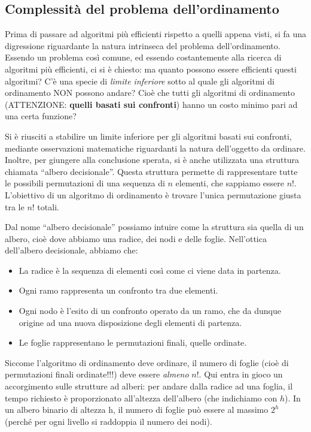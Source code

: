 \documentclass[12pt]{report}
\begin{document}
    \subsection{Complessità del problema dell'ordinamento}
    Prima di passare ad algoritmi più efficienti rispetto a quelli appena visti, si fa una digressione riguardante la natura intrinseca del problema dell’ordinamento.
    Essendo un problema così comune, ed essendo costantemente alla ricerca di algoritmi più efficienti, ci si è chiesto: ma quanto possono essere efficienti questi algoritmi? C’è una specie di \textit{limite inferiore} sotto al quale gli algoritmi di ordinamento NON possono andare? Cioè che tutti gli algoritmi di ordinamento (ATTENZIONE: \textbf{quelli basati sui confronti}) hanno un costo minimo pari ad una certa funzione?
    
    Si è riusciti a stabilire un limite inferiore per gli algoritmi basati sui confronti, mediante osservazioni matematiche riguardanti la natura dell’oggetto da ordinare. Inoltre, per giungere alla conclusione sperata, si è anche utilizzata una struttura chiamata “albero decisionale”.
    Questa struttura permette di rappresentare tutte le possibili permutazioni di una sequenza di $n$ elementi, che sappiamo essere $n!$. L’obiettivo di un algoritmo di ordinamento è trovare l’unica permutazione giusta tra le $n!$ totali.
    
    Dal nome “albero decisionale” possiamo intuire come la struttura sia quella di un albero, cioè dove abbiamo una radice, dei nodi e delle foglie. Nell’ottica dell’albero decisionale, abbiamo che:
    \begin{itemize}
    	
    	\item La radice è la sequenza di elementi così come ci viene data in partenza.
    	
    	\item Ogni ramo rappresenta un confronto tra due elementi.
    	
    	\item Ogni nodo è l’esito di un confronto operato da un ramo, che da dunque origine ad una nuova disposizione degli elementi di partenza.
    	
    	\item Le foglie rappresentano le permutazioni finali, quelle ordinate.
    	
    \end{itemize}
    
    Siccome l’algoritmo di ordinamento deve ordinare, il numero di foglie (cioè di permutazioni finali ordinate!!!) deve essere \textit{almeno} $n!$.
    Qui entra in gioco un accorgimento sulle strutture ad alberi: per andare dalla radice ad una foglia, il tempo richiesto è proporzionato all’altezza dell’albero (che indichiamo con $h$).
    In un albero binario di altezza h, il numero di foglie può essere al massimo $2^h$ (perché per ogni livello si raddoppia il numero dei nodi).
    
\end{document}
